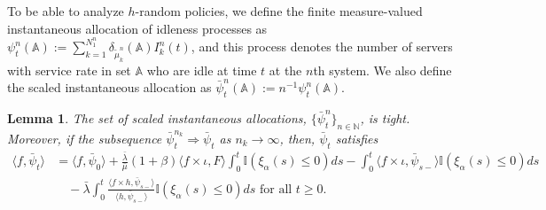 \documentclass[a4paper,11pt,twoside]{article}
\numberwithin{equation}{section}
\numberwithin{figure}{section}
\theoremstyle{plain}
\newtheorem{lemma}[theorem]{Lemma}
\newcommand{\AAA}{\mathbb{A}}
\newcommand{\II}{\mathbb{I}}
\newcommand{\NN}{\mathbb{N}}
\newcommand{\1}{\mathbbm{1}}
\begin{document}
To be able to analyze $h$-random policies, we define the finite measure-valued instantaneous allocation of idleness processes as $\psi_t^n(\AAA):=\sum_{k=1}^{N_1^n}\delta_{\tilde{\mu}_k^n}(\AAA)I_k^n(t)$, and this process denotes the number of servers with service rate in set $\AAA$ who are idle at time $t$ at the $n$th system. 
We also define the scaled instantaneous allocation as $\bar{\psi}_t^n(\AAA):=n^{-1}\psi_t^n(\AAA)$.
\begin{lemma}\label{lem:integral_equation}
The set of scaled instantaneous allocations, $\{\bar{\psi}_t^n\}_{n\in\NN}$, is tight. Moreover, if the subsequence $\bar{\psi}_t^{n_k}\Rightarrow \bar{\psi}_t$ as $n_k\to\infty$, then, $\bar{\psi}_t$ satisfies 
\begin{align}
        \nonumber\langle f,\bar{\psi}_{t}\rangle &=\langle f,\bar{\psi}_{0}\rangle + \frac{\bar{\lambda}}{\bar{\mu}}(1+\beta)\langle f\times \iota, F\rangle \int_0^t\II(\xi_{\alpha}(s)\leq 0)ds - \int_0^t\langle f\times \iota, \bar{\psi}_{s-}\rangle \II(\xi_{\alpha}(s)\leq 0)ds
        \\
        &\quad 
        - \bar{\lambda}\int_0^t \frac{\langle f\times h, \bar{\psi}_{s-}\rangle }{\langle h, \bar{\psi}_{s-}\rangle}\II(\xi_{\alpha}(s)\leq 0)ds \mbox{ for all }t\geq 0.
      \label{eq:limitrandom1}
    \end{align}
\end{lemma}


\end{document}
